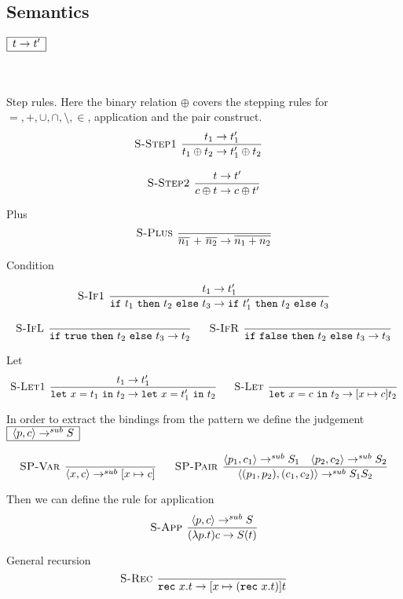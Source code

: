 \documentclass[a4paper]{article}
\newcommand{\s}[1]{\mathtt{#1}}
\newcommand{\sif}{\s{if\ }}
\newcommand{\sthen}{\s{\ then\ }}
\newcommand{\selse}{\s{\ else\ }}
\newcommand{\sifthenelse}[3]{\sif #1 \sthen #2 \selse #3}
\newcommand{\sletin}[2]{\s{let\ } #1 \s{\ in\ } #2}
\newcommand{\srec}{\s{rec\ }}
\newcommand{\strue}{\s{true}}
\newcommand{\sfalse}{\s{false}}
\newcommand{\step}{\to}
\newcommand{\stepsub}{\step^{sub}}
\newcommand{\angled}[1]{\langle #1\rangle}
\renewcommand{\rule}[3][]{\ \mbox{\textsc{#1 }}\dfrac{#2}{#3}\ }
\newcommand{\smbox}[1]{
  $\begin{array}{|c|}
    \hline
    #1 \\
    \hline
  \end{array}$
}
\begin{document}
\subsection{Semantics\label{sec:semantics}}

\smbox{t \step t'}
\\\\

Step rules. Here the binary relation $\oplus$ covers the stepping rules for $= ,+,\cup, \cap,\setminus,\in$, application and the pair construct.
\[\begin{array}{c}
\rule[S-Step1]{t_1 \step t_1'}{t_1 \oplus t_2 \step t_1' \oplus t_2}\quad\\\\
\rule[S-Step2]{t \step t'}{c \oplus t \step c \oplus t'}
\end{array}
\]


Plus
\[
\rule[S-Plus]{}{\overline{n_1} \s{\ +\ } \overline{n_2} \step \overline{n_1 + n_2}}
\]

Condition

\[\begin{array}{c}
\rule[S-If1]{t_1 \step t_1'}{\sifthenelse{t_1}{t_2}{t_3} \step \sifthenelse{t_1'}{t_2}{t_3}}\\\\
\rule[S-IfL]{}{\sifthenelse{\strue}{t_2}{t_3} \step t_2}\quad
\rule[S-IfR]{}{\sifthenelse{\sfalse}{t_2}{t_3} \step t_3}
\end{array}\]

Let
\[
\rule[S-Let1]{t_1 \step t_1'}
  {\sletin{x=t_1}{t_2} \step \sletin{x=t_1'}{t_2}}\quad
\rule[S-Let]{}{\sletin{x=c}{t_2} \step [x \mapsto c ] t_2}
\]


In order to extract the bindings from the pattern we define the
judgement \smbox{\angled{p,c} \stepsub S}
\[
\rule[SP-Var]{}{\angled{x,c} \stepsub [x\mapsto c]}\quad
\rule[SP-Pair]{\angled{p_1, c_1} \stepsub S_1 \quad \angled{p_2, c_2} \stepsub S_2}
{\angled{(p_1,p_2), (c_1, c_2)} \stepsub S_1S_2}
\]

Then we can define the rule for application
\[
\rule[S-App]{\angled{p, c} \stepsub S}{(\lambda p.t) c \step S(t)}
\]

General recursion
\[
\rule[S-Rec]{}{\srec x.t \step [x \mapsto (\srec x.t)] t}
\]
\end{document}
